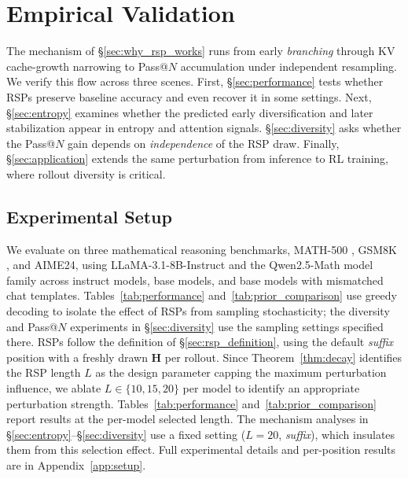 
\section{Empirical Validation}\label{sec:experimental_analysis}

The mechanism of \S\ref{sec:why_rsp_works} runs from early \emph{branching} through KV cache-growth narrowing to Pass@$N$ accumulation under independent resampling. We verify this flow across three scenes. First, \S\ref{sec:performance} tests whether RSPs preserve baseline accuracy and even recover it in some settings. Next, \S\ref{sec:entropy} examines whether the predicted early diversification and later stabilization appear in entropy and attention signals. \S\ref{sec:diversity} asks whether the Pass@$N$ gain depends on \emph{independence} of the RSP draw. Finally, \S\ref{sec:application} extends the same perturbation from inference to RL training, where rollout diversity is critical.

\subsection{Experimental Setup}\label{sec:setup}

We evaluate on three mathematical reasoning benchmarks, MATH-500 \citep{lightman2024lets}, GSM8K \citep{cobbe2021training}, and AIME24, using LLaMA-3.1-8B-Instruct \citep{grattafiori2024llama} and the Qwen2.5-Math model family \citep{yang2024qwen25math} across instruct models, base models, and base models with mismatched chat templates. Tables~\ref{tab:performance} and~\ref{tab:prior_comparison} use greedy decoding to isolate the effect of RSPs from sampling stochasticity; the diversity and Pass@$N$ experiments in \S\ref{sec:diversity} use the sampling settings specified there. RSPs follow the definition of \S\ref{sec:rsp_definition}, using the default \emph{suffix} position with a freshly drawn $\mathbf{H}$ per rollout. Since Theorem~\ref{thm:decay} identifies the RSP length $L$ as the design parameter capping the maximum perturbation influence, we ablate $L \in \{10,15,20\}$ per model to identify an appropriate perturbation strength. Tables~\ref{tab:performance} and~\ref{tab:prior_comparison} report results at the per-model selected length. The mechanism analyses in \S\ref{sec:entropy}--\S\ref{sec:diversity} use a fixed setting ($L{=}20$, \emph{suffix}), which insulates them from this selection effect. Full experimental details and per-position results are in Appendix~\ref{app:setup}.

